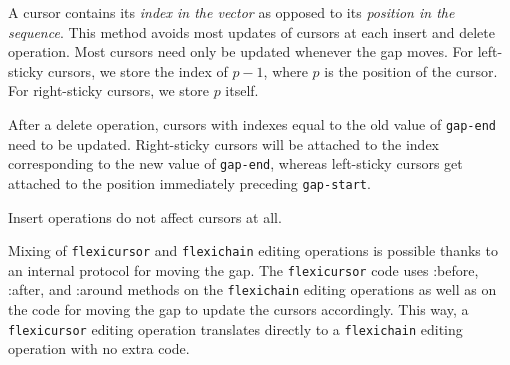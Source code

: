 \documentclass[11pt]{article}
\begin{document}
A cursor contains its \textit{index in the vector} as opposed to its
\textit{position in the sequence}.  This method avoids most updates of
cursors at each insert and delete operation.  Most cursors need only
be updated whenever the gap moves.  For left-sticky cursors, we store
the index of $p-1$, where $p$ is the position of the cursor.  For
right-sticky cursors, we store $p$ itself.

After a delete operation, cursors with indexes equal to the old value
of \texttt{gap-end} need to be updated.  Right-sticky cursors will be
attached to the index corresponding to the new value of
\texttt{gap-end}, whereas left-sticky cursors get attached to the
position immediately preceding \texttt{gap-start}.

Insert operations do not affect cursors at all.

Mixing of \texttt{flexicursor} and \texttt{flexichain} editing
operations is possible thanks to an internal protocol for moving the
gap.  The \texttt{flexicursor} code uses :before, :after, and :around
methods on the \texttt{flexichain} editing operations as well as on
the code for moving the gap to update the cursors accordingly.  This
way, a \texttt{flexicursor} editing operation translates directly to a
\texttt{flexichain} editing operation with no extra code.
\end{document}

